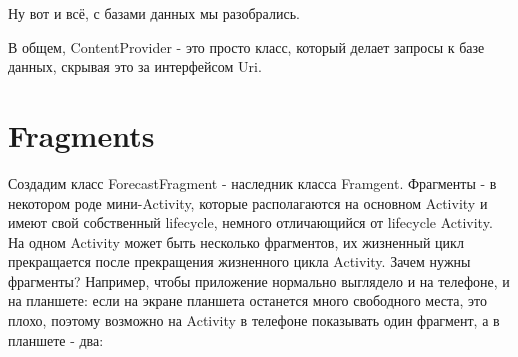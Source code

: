 \documentclass[12 pt]{article}
\begin{document}
    Ну вот и всё, с базами данных мы разобрались.
    
    В общем, ContentProvider - это просто класс, который делает запросы к базе данных, скрывая это за интерфейсом Uri.
    
\section{Fragments}
Создадим класс ForecastFragment - наследник класса Framgent.\newline
Фрагменты - в некотором роде мини-Activity, которые располагаются на основном Activity и имеют свой собственный lifecycle, немного отличающийся от lifecycle Activity. На одном Activity может быть несколько фрагментов, их жизненный цикл прекращается после прекращения жизненного цикла Activity.\newline
Зачем нужны фрагменты? Например, чтобы приложение нормально выглядело и на телефоне, и на планшете: если на экране планшета останется много свободного места, это плохо, поэтому возможно на Activity в телефоне показывать один фрагмент, а в планшете - два:\newline
\end{document}
